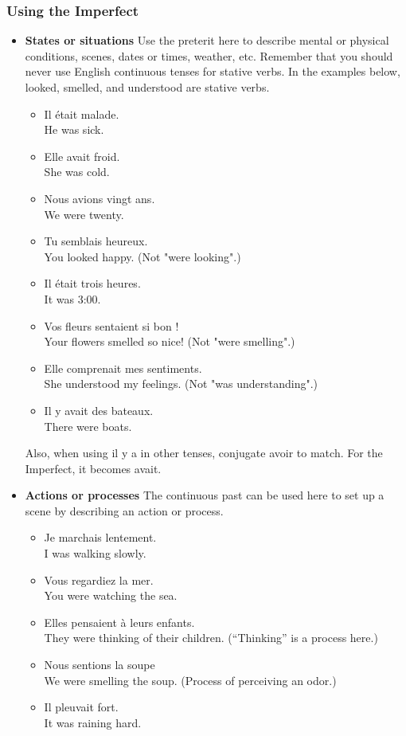 \subsubsection{Using the Imperfect}

\begin{itemize}
  \item  \textbf{States or situations}  Use the preterit here to describe mental or physical conditions, scenes, dates or times, weather, etc. Remember that you should never use English continuous tenses for stative verbs. In the examples below, looked, smelled, and understood are stative verbs.
	
	\begin{itemize}
  \item  Il {\'e}tait malade. \\ He was sick.
	\item  Elle avait froid. \\ She was cold.
	\item  Nous avions vingt ans. \\ We were twenty.
	\item  Tu semblais heureux. \\ You looked happy. (Not "were looking".)
	\item  Il {\'e}tait trois heures. \\ It was 3:00.
	\item  Vos fleurs sentaient si bon ! \\ Your flowers smelled so nice! (Not "were smelling".)
	\item  Elle comprenait mes sentiments. \\ She understood my feelings. (Not "was understanding".)
	\item  Il y avait des bateaux. \\ There were boats.
\end{itemize}
	
	Also, when using il y a in other tenses, conjugate avoir to match. For the Imperfect, it becomes avait.
	
	\item  \textbf{Actions or processes}  The continuous past can be used here to set up a scene by describing an action or process.
	
	\begin{itemize}
  \item  Je marchais lentement. \\ I was walking slowly. 
	\item  Vous regardiez la mer. \\ You were watching the sea.
	\item  Elles pensaient à leurs enfants. \\ They were thinking of their children. (``Thinking'' is a process here.)
	\item  Nous sentions la soupe \\ We were smelling the soup. (Process of perceiving an odor.)
	\item  Il pleuvait fort. \\ It was raining hard.
\end{itemize}


\end{itemize}
